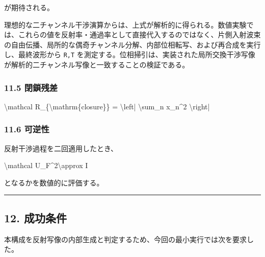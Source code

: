 \documentclass[
  a4paper,
]{article}
\newenvironment{Shaded}{}{}
\newcommand{\NormalTok}[1]{#1}
\begin{document}
が期待される。

理想的な二チャンネル干渉演算からは、上式が解析的に得られる。数値実験では、これらの値を反射率・通過率として直接代入するのではなく、片側入射波束の自由伝播、局所的な偶奇チャンネル分解、内部位相転写、および再合成を実行し、最終波形から
\texttt{R,T}
を測定する。位相掃引は、実装された局所交換干渉写像が解析的二チャンネル写像と一致することの検証である。

\subsubsection{11.5 閉鎖残差}\label{ux9589ux9396ux6b8bux5dee}

\begin{Shaded}
\begin{Highlighting}[]
\NormalTok{\textbackslash{}mathcal R\_\{\textbackslash{}mathrm\{closure\}\}}
\NormalTok{=}
\NormalTok{\textbackslash{}left|}
\NormalTok{\textbackslash{}sum\_n x\_n\^{}2}
\NormalTok{\textbackslash{}right|}
\end{Highlighting}
\end{Shaded}

\subsubsection{11.6 可逆性}\label{ux53efux9006ux6027}

反射干渉過程を二回適用したとき、

\begin{Shaded}
\begin{Highlighting}[]
\NormalTok{\textbackslash{}mathcal U\_F\^{}2\textbackslash{}approx I}
\end{Highlighting}
\end{Shaded}

となるかを数値的に評価する。

\begin{center}\rule{0.5\linewidth}{0.5pt}\end{center}

\subsection{12. 成功条件}\label{ux6210ux529fux6761ux4ef6}

本構成を反射写像の内部生成と判定するため、今回の最小実行では次を要求した。
\end{document}
